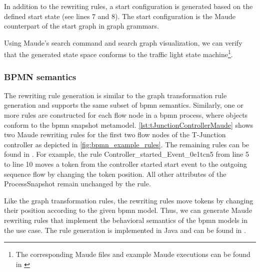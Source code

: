 \documentclass{jot}
\begin{document}
In addition to the rewriting rules, a start configuration is generated based on the defined start state (see lines 7 and 8).
The start configuration is the Maude counterpart of the start graph in graph grammars.



Using Maude's search command and search graph visualization, we can verify that the generated state space conforms to the traffic light state machine\footnote{\label{footnote:maudeArtifacts}The corresponding Maude files and example Maude executions can be found in \cite{krauterArtifactsBehavioralConsistency2022}}.

\subsubsection{BPMN semantics}
The rewriting rule generation is similar to the graph transformation rule generation and supports the same subset of \gls*{bpmn} semantics.
Similarly, one or more rules are constructed for each flow node in a \gls*{bpmn} process, where objects conform to the \gls*{bpmn} snapshot metamodel.
\autoref{lst:tJunctionControllerMaude} shows two Maude rewriting rules for the first two flow nodes of the T-Junction controller as depicted in \cref{fig:bpmn_example_rules}.
The remaining rules can be found in \cite{krauterArtifactsBehavioralConsistency2022}.
For example, the rule \textsf{Controller\_started\_Event\_0e1tcn5} from line 5 to line 10 moves a token from the controller started start event to the outgoing sequence flow by changing the token position.
All other attributes of the \textsf{ProcessSnapshot} remain unchanged by the rule.





Like the graph transformation rules, the rewriting rules move tokens by changing their position according to the given \gls*{bpmn} model.
Thus, we can generate Maude rewriting rules that implement the behavioral semantics of the \gls*{bpmn} models in the use case.
The rule generation is implemented in Java and can be found in \cite{krauterRewriteRuleGeneration2022}.
\end{document}
